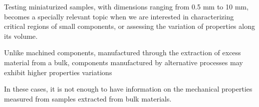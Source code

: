 % 
Testing miniaturized samples, with dimensions ranging from 0.5 mm to 10 mm, becomes
a specially relevant topic when we are interested in characterizing critical
regions of small components, or assessing the variation of properties along its 
volume.

Unlike machined components, manufactured through the extraction of excess material 
from a bulk, components manufactured by alternative processes may exhibit higher
properties variations

In these cases, it is not enough to have information on the mechanical properties
measured from samples extracted from bulk materials.




